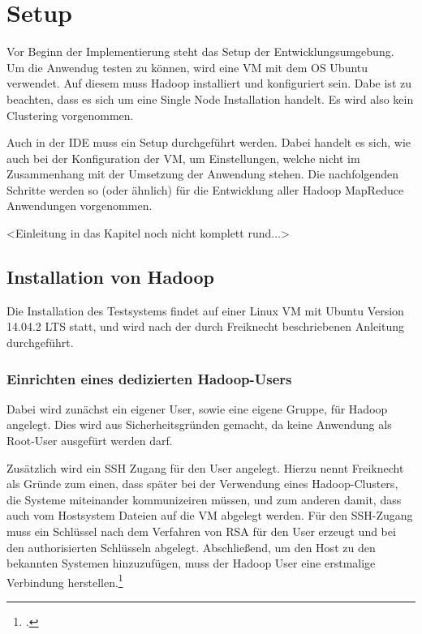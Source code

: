 
\chapter{Setup}\label{cha:Setup}
Vor Beginn der Implementierung steht das Setup der Entwicklungsumgebung. Um die Anwendug testen zu können, wird eine \ac{VM} mit dem \ac{OS} Ubuntu verwendet. Auf diesem muss Hadoop installiert und konfiguriert sein. Dabe ist zu beachten, dass es sich um eine Single Node Installation handelt. Es wird also kein Clustering vorgenommen.

Auch in der \ac{IDE} muss ein Setup durchgeführt werden. Dabei handelt es sich, wie auch bei der Konfiguration der \ac{VM}, um Einstellungen, welche nicht im Zusammenhang mit der Umsetzung der Anwendung stehen. Die nachfolgenden Schritte werden so (oder ähnlich) für die Entwicklung aller Hadoop MapReduce Anwendungen vorgenommen.

<Einleitung in das Kapitel noch nicht komplett rund...>

\section{Installation von Hadoop}
Die Installation des Testsystems findet auf einer Linux \ac{VM} mit Ubuntu Version 14.04.2 \ac{LTS} statt, und wird nach der durch Freiknecht beschriebenen Anleitung durchgeführt. 

\subsection{Einrichten eines dedizierten Hadoop-Users}
Dabei wird zunächst ein eigener User, sowie eine eigene Gruppe, für Hadoop angelegt. Dies wird aus Sicherheitsgründen gemacht, da keine Anwendung als Root-User ausgefürt werden darf.

Zusätzlich wird ein \ac{SSH} Zugang für den User angelegt. Hierzu nennt Freiknecht als Gründe zum einen, dass später bei der Verwendung eines Hadoop-Clusters, die Systeme miteinander kommunizeiren müssen, und zum anderen damit, dass auch vom Hostsystem Dateien auf die \ac{VM} abgelegt werden. Für den \ac{SSH}-Zugang muss ein Schlüssel nach dem Verfahren von \ac{RSA} für den User erzeugt und bei den authorisierten Schlüsseln abgelegt. Abschließend, um den Host zu den bekannten Systemen hinzuzufügen, muss der Hadoop User eine erstmalige Verbindung herstellen.\footcite[Vgl.][S. 30 f.]{Freiknecht.2014}

